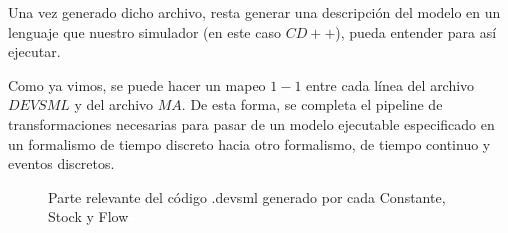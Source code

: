 Una vez generado dicho archivo, resta generar una descripción del modelo en un lenguaje que nuestro simulador (en este caso $CD++$), pueda entender para así ejecutar. 

Como ya vimos, se puede hacer un mapeo $1-1$ entre cada línea del archivo $DEVSML$ y del archivo $MA$. De esta forma, se completa el pipeline de transformaciones necesarias para pasar de un modelo ejecutable especificado en un formalismo de tiempo discreto hacia otro formalismo, de tiempo continuo y eventos discretos.

\begin{figure}[!h]
\centering     %
{}
\caption{Parte relevante del código .devsml generado por cada Constante, Stock y Flow}
\end{figure}


